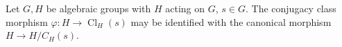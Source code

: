 Let $G, H$ be algebraic groups with $H$ acting on $G$, $s \in G$. The conjugacy class morphism $\varphi: H \rightarrow \operatorname{Cl}_H(s)$ may be identified with the canonical morphism $H \rightarrow H/C_H(s)$.
